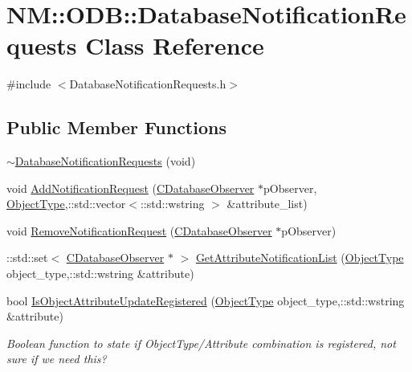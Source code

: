 \hypertarget{class_n_m_1_1_o_d_b_1_1_database_notification_requests}{}\section{N\+M\+:\+:O\+D\+B\+:\+:Database\+Notification\+Requests Class Reference}
\label{class_n_m_1_1_o_d_b_1_1_database_notification_requests}


{\ttfamily \#include $<$Database\+Notification\+Requests.\+h$>$}

\subsection*{Public Member Functions}
\begin{DoxyCompactItemize}
\item 
\hyperlink{class_n_m_1_1_o_d_b_1_1_database_notification_requests_aee52b22613d80f73e05e97635c8ad070}{$\sim$\+Database\+Notification\+Requests} (void)
\item 
void \hyperlink{class_n_m_1_1_o_d_b_1_1_database_notification_requests_aaec7b60add9cf7f77c607e8a56d19413}{Add\+Notification\+Request} (\hyperlink{class_n_m_1_1_o_d_b_1_1_c_database_observer}{C\+Database\+Observer} $\ast$p\+Observer, \hyperlink{namespace_n_m_1_1_o_d_b_ac9f60beb4a1c8a6240dd0c8baa281345}{Object\+Type},\+::std\+::vector$<$\+::std\+::wstring $>$ \&attribute\+\_\+list)
\item 
void \hyperlink{class_n_m_1_1_o_d_b_1_1_database_notification_requests_a25f0da2399287990dc4d597885d3c588}{Remove\+Notification\+Request} (\hyperlink{class_n_m_1_1_o_d_b_1_1_c_database_observer}{C\+Database\+Observer} $\ast$p\+Observer)
\item 
\+::std\+::set$<$ \hyperlink{class_n_m_1_1_o_d_b_1_1_c_database_observer}{C\+Database\+Observer} $\ast$ $>$ \hyperlink{class_n_m_1_1_o_d_b_1_1_database_notification_requests_aec57a4b7e864bbf9ed0a29402a55d10c}{Get\+Attribute\+Notification\+List} (\hyperlink{namespace_n_m_1_1_o_d_b_ac9f60beb4a1c8a6240dd0c8baa281345}{Object\+Type} object\+\_\+type,\+::std\+::wstring \&attribute)
\item 
bool \hyperlink{class_n_m_1_1_o_d_b_1_1_database_notification_requests_a9d5caa1bb9d4c07af7e1bb1d8be6d86f}{Is\+Object\+Attribute\+Update\+Registered} (\hyperlink{namespace_n_m_1_1_o_d_b_ac9f60beb4a1c8a6240dd0c8baa281345}{Object\+Type} object\+\_\+type,\+::std\+::wstring \&attribute)
\begin{DoxyCompactList}\small\item\em Boolean function to state if Object\+Type/\+Attribute combination is registered, not sure if we need this? \end{DoxyCompactList}\end{DoxyCompactItemize}
